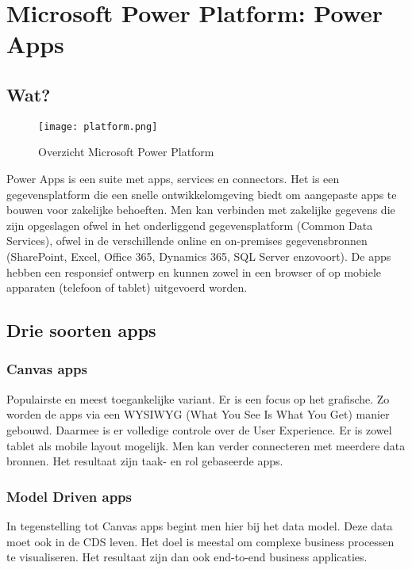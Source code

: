 \section{Microsoft Power Platform: Power Apps}
\label{sec:power-platform}

\subsection{Wat?}

\begin{figure}[h!]
    \texttt{[image: platform.png]}
    \caption{Overzicht Microsoft Power Platform \autocite{MicrosoftDocs2019a}}
    \label{fig:mspowerplatform}
\end{figure}

Power Apps is een suite met apps, services en connectors. Het is een gegevensplatform die een snelle ontwikkelomgeving biedt om aangepaste apps te bouwen voor zakelijke behoeften. Men kan verbinden met zakelijke gegevens die zijn opgeslagen ofwel in het onderliggend gegevensplatform (Common Data Services), ofwel in de verschillende online en on-premises gegevensbronnen (SharePoint, Excel, Office 365, Dynamics 365, SQL Server enzovoort). De apps hebben een responsief ontwerp en kunnen zowel in een browser of op mobiele apparaten (telefoon of tablet) uitgevoerd worden. \autocite{MicrosoftDocs2019}

\subsection{Drie soorten apps}

\subsubsection{Canvas apps}

Populairste en meest toegankelijke variant. Er is een focus op het grafische. Zo worden de apps via een WYSIWYG (What You See Is What You Get) manier gebouwd. Daarmee is er volledige controle over de User Experience. Er is zowel tablet als mobile layout mogelijk. Men kan verder connecteren met meerdere data bronnen. Het resultaat zijn taak- en rol gebaseerde apps. \autocite{PragmaticWorks2019}

\subsubsection{Model Driven apps}

In tegenstelling tot Canvas apps begint men hier bij het data model. Deze data moet ook in de CDS leven. Het doel is meestal om complexe business processen te visualiseren. Het resultaat zijn dan ook end-to-end business applicaties. \autocite{PragmaticWorks2019}

